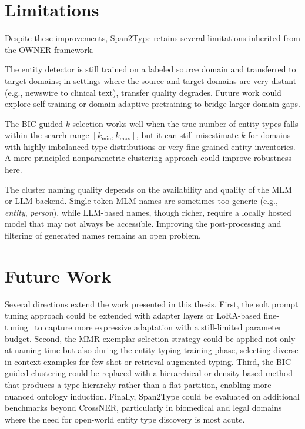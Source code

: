 \documentclass[14pt]{extreport}
\begin{document}
\section{Limitations}

Despite these improvements, Span2Type retains several limitations inherited from the OWNER framework.

The entity detector is still trained on a labeled source domain and transferred to target domains; in settings where the source and target domains are very distant (e.g., newswire to clinical text), transfer quality degrades. Future work could explore self-training or domain-adaptive pretraining to bridge larger domain gaps.

The BIC-guided $k$ selection works well when the true number of entity types falls within the search range $[k_{\min}, k_{\max}]$, but it can still misestimate $k$ for domains with highly imbalanced type distributions or very fine-grained entity inventories. A more principled nonparametric clustering approach could improve robustness here.

The cluster naming quality depends on the availability and quality of the MLM or LLM backend. Single-token MLM names are sometimes too generic (e.g., \textit{entity}, \textit{person}), while LLM-based names, though richer, require a locally hosted model that may not always be accessible. Improving the post-processing and filtering of generated names remains an open problem.

\section{Future Work}

Several directions extend the work presented in this thesis. First, the soft prompt tuning approach could be extended with adapter layers or LoRA-based fine-tuning~\cite{hu-etal-2022-lora} to capture more expressive adaptation with a still-limited parameter budget. Second, the MMR exemplar selection strategy could be applied not only at naming time but also during the entity typing training phase, selecting diverse in-context examples for few-shot or retrieval-augmented typing. Third, the BIC-guided clustering could be replaced with a hierarchical or density-based method that produces a type hierarchy rather than a flat partition, enabling more nuanced ontology induction. Finally, Span2Type could be evaluated on additional benchmarks beyond CrossNER, particularly in biomedical and legal domains where the need for open-world entity type discovery is most acute.

\clearpage	
{}


\end{document}

